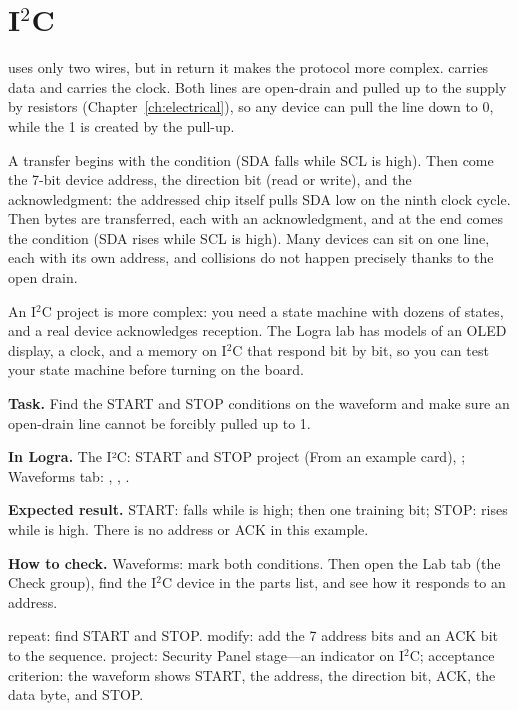\section{I$^2$C}

 uses only two wires, but in return it makes the protocol more
complex.  carries data and  carries the clock. Both lines
are open-drain and pulled up to the supply by resistors
(Chapter~\ref{ch:electrical}), so any device can pull the line down to 0, while
the 1 is created by the pull-up.

A transfer begins with the  condition (SDA falls while SCL is
high). Then come the 7-bit device address, the direction bit (read or write),
and the  acknowledgment: the addressed chip itself pulls SDA low on
the ninth clock cycle. Then bytes are transferred, each with an
acknowledgment, and at the end comes the  condition (SDA rises while
SCL is high). Many devices can sit on one line, each with its own address, and
collisions do not happen precisely thanks to the open drain.

An I$^2$C project is more complex: you need a state machine with dozens of
states, and a real device acknowledges reception. The Logra lab has models of
an OLED display, a clock, and a memory on I$^2$C that respond bit by bit, so you
can test your state machine before turning on the board.

\begin{diybox}
\textbf{Task.} Find the START and STOP conditions on the waveform and make sure an open-drain line cannot be forcibly pulled up to 1.

\textbf{In Logra.} The I²C: START and STOP project (From an example card), ; Waveforms tab: , , .

\textbf{Expected result.} START:  falls while  is high; then one training bit; STOP:  rises while  is high. There is no address or ACK in this example.

\textbf{How to check.} Waveforms: mark both conditions. Then open the Lab tab (the Check group), find the I$^2$C device in the parts list, and see how it responds to an address.

 repeat: find START and STOP.  modify: add the 7 address bits and an ACK bit to the sequence.  project: Security Panel stage---an indicator on I$^2$C; acceptance criterion: the waveform shows START, the address, the direction bit, ACK, the data byte, and STOP.
\end{diybox}

